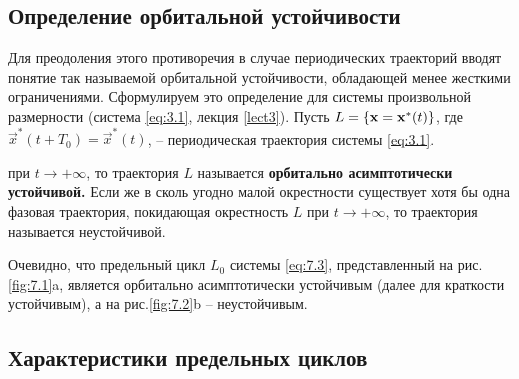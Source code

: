 \subsection{Определение орбитальной устойчивости}%
\label{sub:7.2.1}

Для преодоления этого противоречия в случае периодических траекторий вводят понятие так называемой
орбитальной устойчивости, обладающей менее жесткими ограничениями. Сформулируем это определение для системы произвольной размерности
(система \eqref{eq:3.1}, лекция \ref{lect3}). Пусть $L=\qty{\mathbf x = \mathbf x^*(t)}$, где
$\vec x^*(t+T_0)=\vec x^*(t)$, -- периодическая траектория системы \eqref{eq:3.1}.

 при $t \to + \infty$, то траектория $L$ называется \textbf{орбитально асимптотически устойчивой.} Если же в сколь угодно малой окрестности существует хотя бы одна фазовая траектория, покидающая окрестность $L$ при $t \to + \infty$, то траектория называется неустойчивой.
        
Очевидно, что предельный цикл $L_0$ системы \eqref{eq:7.3}, представленный на рис.\ref{fig:7.1}a, является орбитально асимптотически устойчивым (далее для краткости устойчивым), а на рис.\ref{fig:7.2}b -- неустойчивым.

\subsection{Характеристики предельных циклов}%
\label{sub:7.2.2}

